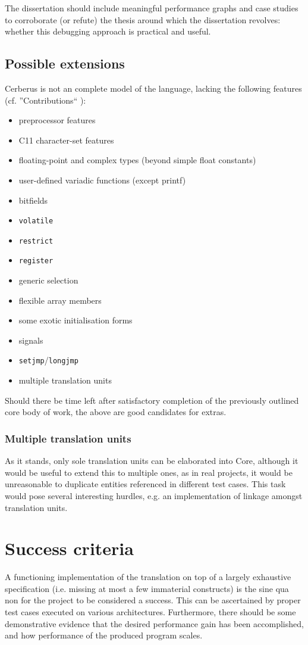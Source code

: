 \documentclass[12pt]{article}
\begin{document}
The dissertation should include meaningful performance graphs and case studies to corroborate (or refute) the thesis around which the dissertation revolves: whether this debugging approach is practical and useful.

\subsection{Possible extensions}
Cerberus is not an complete model of the language, lacking the following features (cf. ''Contributions`` \cite{1}):
\begin{itemize}
	\setlength\itemsep{0em}
	\item preprocessor features
	\item C11 character-set features
	\item floating-point and complex types (beyond simple float constants)
	\item user-defined variadic	functions (except printf)
	\item bitfields
	\item \texttt{volatile}
	\item \texttt{restrict}
	\item \texttt{register}
	\item generic selection
	\item flexible array members
	\item some exotic initialisation forms
	\item signals
	\item \texttt{setjmp}/\texttt{longjmp}
	\item multiple translation units
\end{itemize}
Should there be time left after satisfactory completion of the previously outlined core body of work, the above are good candidates for extras. 

\subsubsection{Multiple translation units}
As it stands, only sole translation units can be elaborated into Core, although it would be useful to extend this to multiple ones, as in real projects, it would be unreasonable to duplicate entities referenced in different test cases. This task would pose several interesting hurdles, e.g. an implementation of linkage amongst translation units.
 
\section{Success criteria}
A functioning implementation of the translation on top of a largely exhaustive specification (i.e. missing at most a few immaterial constructs) is the sine qua non for the project to be considered a success. This can be ascertained by proper test cases executed on various architectures. Furthermore, there should be some demonstrative evidence that the desired performance gain has been accomplished, and how performance of the produced program scales. 
\end{document}
